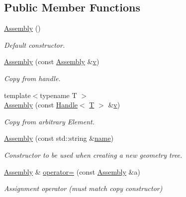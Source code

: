 \subsection*{Public Member Functions}
\begin{DoxyCompactItemize}
\item 
\hyperlink{class_d_d4hep_1_1_geometry_1_1_assembly_a18347f291bd562b3ef99fe05f043b03c}{Assembly} ()
\begin{DoxyCompactList}\small\item\em Default constructor. \end{DoxyCompactList}\item 
\hyperlink{class_d_d4hep_1_1_geometry_1_1_assembly_a8eb0042bd057b80ad9e4e3e716de4399}{Assembly} (const \hyperlink{class_d_d4hep_1_1_geometry_1_1_assembly}{Assembly} \&\hyperlink{_multi_view_8cpp_a8320ee13ac034dbf6d624fe8953dd337}{v})
\begin{DoxyCompactList}\small\item\em Copy from handle. \end{DoxyCompactList}\item 
{\footnotesize template$<$typename T $>$ }\\\hyperlink{class_d_d4hep_1_1_geometry_1_1_assembly_a0d1dbff35d62862a6bebf04d9a4d175e}{Assembly} (const \hyperlink{class_d_d4hep_1_1_handle}{Handle}$<$ \hyperlink{class_t}{T} $>$ \&\hyperlink{_multi_view_8cpp_a8320ee13ac034dbf6d624fe8953dd337}{v})
\begin{DoxyCompactList}\small\item\em Copy from arbitrary Element. \end{DoxyCompactList}\item 
\hyperlink{class_d_d4hep_1_1_geometry_1_1_assembly_ac077a7f58738bc18ea24650128af2680}{Assembly} (const std\+::string \&\hyperlink{class_d_d4hep_1_1_handle_a27c7d467a609ab32c133e1f3c7d85ef5}{name})
\begin{DoxyCompactList}\small\item\em Constructor to be used when creating a new geometry tree. \end{DoxyCompactList}\item 
\hyperlink{class_d_d4hep_1_1_geometry_1_1_assembly}{Assembly} \& \hyperlink{class_d_d4hep_1_1_geometry_1_1_assembly_a49d6772ff3ef1ed2a49a27ce35caaaac}{operator=} (const \hyperlink{class_d_d4hep_1_1_geometry_1_1_assembly}{Assembly} \&a)
\begin{DoxyCompactList}\small\item\em Assignment operator (must match copy constructor) \end{DoxyCompactList}\end{DoxyCompactItemize}
